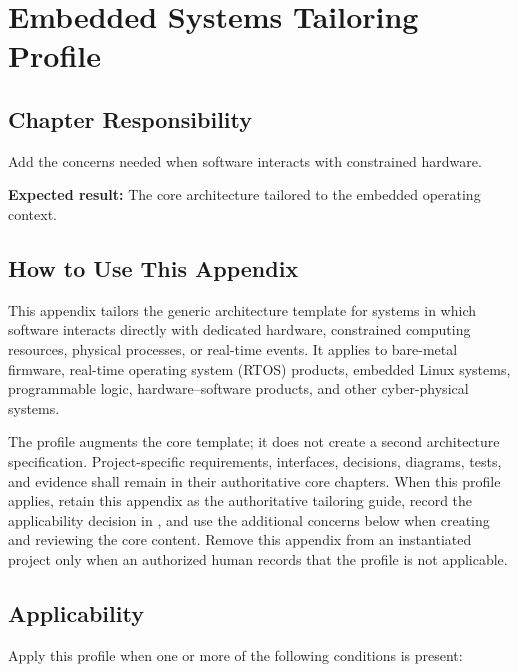 \chapter{Embedded Systems Tailoring Profile}

\section{Chapter Responsibility}
\label{Section:EmbeddedSystemsProfileResponsibility}
Add the concerns needed when software interacts with constrained hardware.

\noindent\textbf{Expected result:} The core architecture tailored to the embedded operating context.

\section{How to Use This Appendix}
This appendix tailors the generic architecture template for systems in which
software interacts directly with dedicated hardware, constrained computing
resources, physical processes, or real-time events. It applies to bare-metal
firmware, real-time operating system (RTOS) products, embedded Linux systems, programmable
logic, hardware--software products, and other cyber-physical systems.

The profile augments the core template; it does not create a second
architecture specification. Project-specific requirements, interfaces,
decisions, diagrams, tests, and evidence shall remain in their authoritative
core chapters. When this profile applies, retain this appendix as the
authoritative tailoring guide, record the applicability decision in
, and use the additional concerns below when
creating and reviewing the core content. Remove this appendix from an
instantiated project only when an authorized human records that the profile is
not applicable.

\section{Applicability}
\label{Section:EmbeddedProfileApplicability}
Apply this profile when one or more of the following conditions is present:

